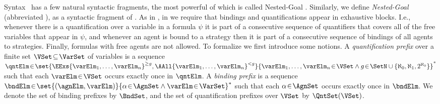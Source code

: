 \begin{subsection}{Syntax}
		\SL\ has a few natural syntactic fragments, the most powerful of which is
		called Nested-Goal \SL.
		Similarly, we define \emph{Nested-Goal \GSLT} (abbreviated \NGGSLT), as a syntactic fragment of
		\GSLT.
		As in  \NGSL, in \NGGSLT we require that bindings and 
		quantifications appear in exhaustive blocks. I.e., whenever there is a 
quantification over a variable in a formula $\psi$ it is part of a consecutive 
sequence of quantifiers that covers all of the free variables that appear in 
$\psi$, and whenever an agent is bound to a strategy then it is part of a 
consecutive sequence of bindings of all agents to strategies. Finally, formulas 
with free agents are not allowed.
		To formalize \NGGSLT we first introduce some notions.
		A \emph{quantification prefix} over a finite set $\VSet \!\subseteq\! \VarSet$ of
		variables is a sequence $\qntElm \!\in\! \set{ \EExs{\varElm_{1},\ldots,
		\varElm_{n}}^{\geq g}, \AAll{\varElm_{1},\ldots, \varElm_{n}}^{< g} }{
		\varElm_{1},\ldots, \varElm_{n} \!\in\! \VSet \land g \!\in\! 
		\SetN \cup \{\aleph_0, \aleph_1, 2^{\aleph_0}\}
		}^{*}$ such that each $\varElm \!\in\!
		\VSet$ occurs exactly once in $\qntElm$.
		A \emph{binding prefix} is a sequence
		$\bndElm \!\in\! \set{ (\agnElm, \varElm) }{ \alpha \!\in\! \AgnSet \land
		\varElm \!\in\! \VarSet }^{*}$ such that each $\alpha \!\in\!
		\AgnSet$ occurs exactly once in $\bndElm$.
		We denote the set of binding prefixes by $\BndSet$, and the set
		of quantification prefixes over $\VSet$ by $\QntSet(\VSet)$.

		
		

\end{subsection}
